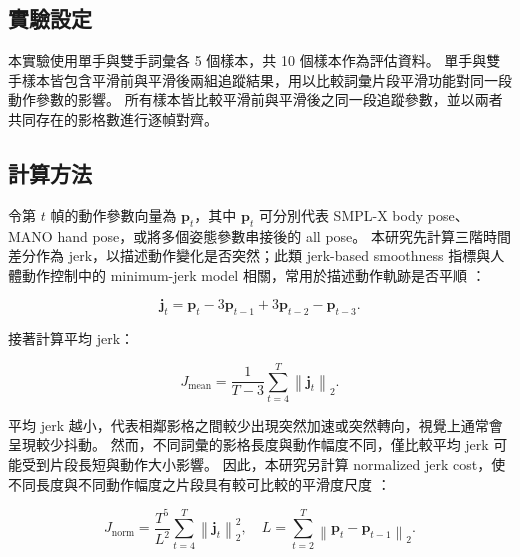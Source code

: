 \documentclass[class=NCU_thesis, crop=false]{standalone}
\begin{document}
\subsection{實驗設定}

本實驗使用單手與雙手詞彙各 5 個樣本，共 10 個樣本作為評估資料。
單手與雙手樣本皆包含平滑前與平滑後兩組追蹤結果，用以比較詞彙片段平滑功能對同一段動作參數的影響。
所有樣本皆比較平滑前與平滑後之同一段追蹤參數，並以兩者共同存在的影格數進行逐幀對齊。

\subsection{計算方法}

令第 $t$ 幀的動作參數向量為 $\mathbf{p}_{t}$，其中 $\mathbf{p}_{t}$ 可分別代表 SMPL-X body pose、MANO hand pose，或將多個姿態參數串接後的 all pose。
本研究先計算三階時間差分作為 jerk，以描述動作變化是否突然；此類 jerk-based smoothness 指標與人體動作控制中的 minimum-jerk model 相關，常用於描述動作軌跡是否平順 \cite{flash1985coordination,balasubramanian2015smoothness}：

\begin{equation}
    \mathbf{j}_{t}
    =
    \mathbf{p}_{t}
    - 3\mathbf{p}_{t-1}
    + 3\mathbf{p}_{t-2}
    - \mathbf{p}_{t-3}.
    \label{eq:word_smoothing_jerk}
\end{equation}

接著計算平均 jerk：

\begin{equation}
    J_{\mathrm{mean}}
    =
    \frac{1}{T-3}
    \sum_{t=4}^{T}
    \left\|
    \mathbf{j}_{t}
    \right\|_{2}.
    \label{eq:word_smoothing_mean_jerk}
\end{equation}

平均 jerk 越小，代表相鄰影格之間較少出現突然加速或突然轉向，視覺上通常會呈現較少抖動。
然而，不同詞彙的影格長度與動作幅度不同，僅比較平均 jerk 可能受到片段長短與動作大小影響。
因此，本研究另計算 normalized jerk cost，使不同長度與不同動作幅度之片段具有較可比較的平滑度尺度 \cite{balasubramanian2015smoothness}：

\begin{equation}
    J_{\mathrm{norm}}
    =
    \frac{T^{5}}{L^{2}}
    \sum_{t=4}^{T}
    \left\|
    \mathbf{j}_{t}
    \right\|_{2}^{2},
    \quad
    L =
    \sum_{t=2}^{T}
    \left\|
    \mathbf{p}_{t}
    -
    \mathbf{p}_{t-1}
    \right\|_{2}.
    \label{eq:word_smoothing_normalized_jerk}
\end{equation}
\end{document}
